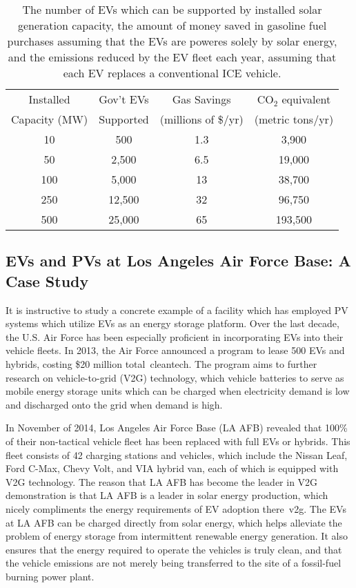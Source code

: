 \begin{table}[]
\caption{The number of EVs which can be supported by installed solar generation capacity, the amount of money saved in gasoline fuel purchases assuming that the EVs are poweres solely by solar energy, and the emissions reduced by the EV fleet each year, assuming that each EV replaces a conventional ICE vehicle. }
\centering 
\begin{tabular}{c c c c} 
\hline 
Installed  &  Gov't EVs & Gas Savings& CO$_2$ equivalent   \\ 
[ .1 ex]
Capacity (MW) &Supported &  (millions of \$/yr) & (metric tons/yr)   \\ 
[ .1 ex]
\hline
10& 500 & 1.3 & 3,900 \\
50& 2,500  & 6.5 & 19,000  \\ 
100& 5,000  & 13 & 38,700  \\ 
250& 12,500 & 32 & 96,750 \\ 
500& 25,000  & 65 & 193,500 \\ 
\hline
\end{tabular}
\label{table:EVplan}
\end{table}





\subsection{EVs and PVs at Los Angeles Air Force Base: A Case Study}

It is instructive to study a concrete example of a facility which has employed PV systems which utilize EVs as an energy storage platform. Over the last decade, the U.S. Air Force has been especially proficient in incorporating EVs into their vehicle fleets. In 2013, the Air Force announced a program to lease 500 EVs and hybrids, costing \$20 million total~\cite{eric}{cleantech}. The program aims to further research on vehicle-to-grid (V2G) technology, which vehicle batteries to serve as mobile energy storage units which can be charged when electricity demand is low and discharged onto the grid when demand is high.

In November of 2014, Los Angeles Air Force Base (LA AFB) revealed that 100\% of their non-tactical vehicle fleet has been replaced with full EVs or hybrids. This fleet consists of 42 charging stations and vehicles, which include the Nissan Leaf, Ford C-Max, Chevy Volt, and VIA hybrid van, each of which is equipped with V2G technology. The reason that LA AFB has become the leader in V2G demonstration is that LA AFB is a leader in solar energy production, which nicely compliments the energy requirements of EV adoption there~\cite{eric}{v2g}. The EVs at LA AFB can be charged directly from solar energy, which helps alleviate the problem of energy storage from intermittent renewable energy generation. It also ensures that the energy required to operate the vehicles is truly clean, and that the vehicle emissions are not merely being transferred to the site of a fossil-fuel burning power plant.


